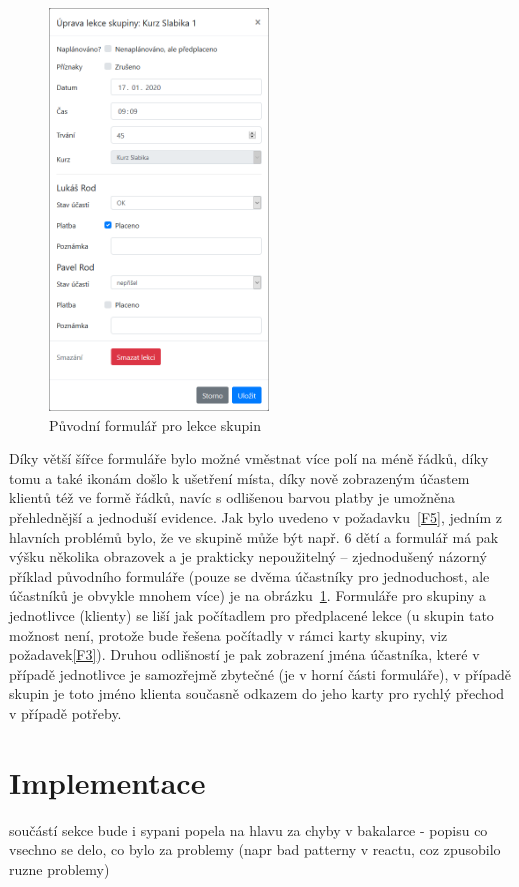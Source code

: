 \begin{figure}\centering
    \includegraphics[width=0.52\textwidth]{img/ui-screen-lekce-skupina.png}
    \caption{Původní formulář pro lekce skupin}\label{fig:ui-screen-lekce-skupina}
\end{figure}

Díky větší šířce formuláře bylo možné vměstnat více polí na méně řádků, díky tomu a také ikonám došlo k ušetření místa, díky nově zobrazeným účastem klientů též ve formě řádků, navíc s odlišenou barvou platby je umožněna přehlednější a jednoduší evidence. Jak bylo uvedeno v požadavku~\ref{F5}, jedním z hlavních problémů bylo, že ve skupině může být např. 6 dětí a formulář má pak výšku několika obrazovek a je prakticky nepoužitelný -- zjednodušený názorný příklad původního formuláře (pouze se dvěma účastníky pro jednoduchost, ale účastníků je obvykle mnohem více) je na obrázku~\ref{fig:ui-screen-lekce-skupina}. Formuláře pro skupiny a jednotlivce (klienty) se liší jak počítadlem pro předplacené lekce (u skupin tato možnost není, protože bude řešena počítadly v rámci karty skupiny, viz požadavek\ref{F3}). Druhou odlišností je pak zobrazení jména účastníka, které v případě jednotlivce je samozřejmě zbytečné (je v horní části formuláře), v případě skupin je toto jméno klienta současně odkazem do jeho karty pro rychlý přechod v případě potřeby.

\chapter{Implementace}
součástí sekce bude i sypani popela na hlavu za chyby v bakalarce - popisu co vsechno se delo, co bylo za problemy (napr bad patterny v reactu, coz zpusobilo ruzne problemy)

